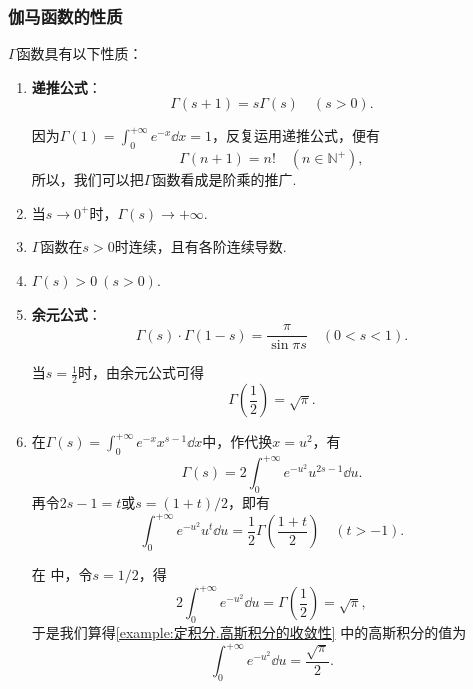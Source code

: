 \subsubsection{伽马函数的性质}
\begin{property}
\(\Gamma\)函数具有以下性质：
\begin{enumerate}
\item {\bf 递推公式}：\begin{equation}
\Gamma(s+1) = s \Gamma(s) \quad (s > 0).
\end{equation}

因为\(\Gamma(1) = \int_0^{+\infty} e^{-x} \dd{x} = 1\)，反复运用递推公式，便有\begin{equation}\label{equation:定积分.伽马函数与阶乘的联系}
\Gamma(n+1) = n! \quad (n\in\mathbb{N}^+),
\end{equation}所以，我们可以把\(\Gamma\)函数看成是阶乘的推广.

\item 当\(s\to0^+\)时，\(\Gamma(s) \to +\infty\).

\item \(\Gamma\)函数在\(s > 0\)时连续，且有各阶连续导数.

\item \(\Gamma(s) > 0\ (s>0)\).

\item {\bf 余元公式}：\begin{equation}\label{equation:定积分.余元公式}
\Gamma(s) \cdot \Gamma(1-s) = \frac{\pi}{\sin{\pi s}} \quad (0 < s < 1).
\end{equation}

当\(s = \frac{1}{2}\)时，由余元公式可得\begin{equation}
\Gamma\left(\frac{1}{2}\right) = \sqrt{\pi}.
\end{equation}

\item 在\(\Gamma(s) = \int_0^{+\infty} e^{-x} x^{s-1} \dd{x}\)中，作代换\(x = u^2\)，有\begin{equation}\label{equation:定积分.伽马函数.中间步骤1}
\Gamma(s) = 2 \int_0^{+\infty} e^{-u^2} u^{2s-1} \dd{u}.
\end{equation}
再令\(2s-1 = t\)或\(s = (1+t)/2\)，即有\begin{equation}
\int_0^{+\infty} e^{-u^2} u^t \dd{u}
= \frac{1}{2} \Gamma\left(\frac{1+t}{2}\right)
\quad (t > -1).
\end{equation}

在  中，令\(s=1/2\)，得\[
2\int_0^{+\infty} e^{-u^2} \dd{u}
= \Gamma\left(\frac{1}{2}\right)
= \sqrt{\pi},
\]
于是我们算得\cref{example:定积分.高斯积分的收敛性} 中的高斯积分的值为
\begin{equation}
\int_0^{+\infty} e^{-u^2} \dd{u} = \frac{\sqrt{\pi}}{2}.
\end{equation}
\end{enumerate}
\end{property}

